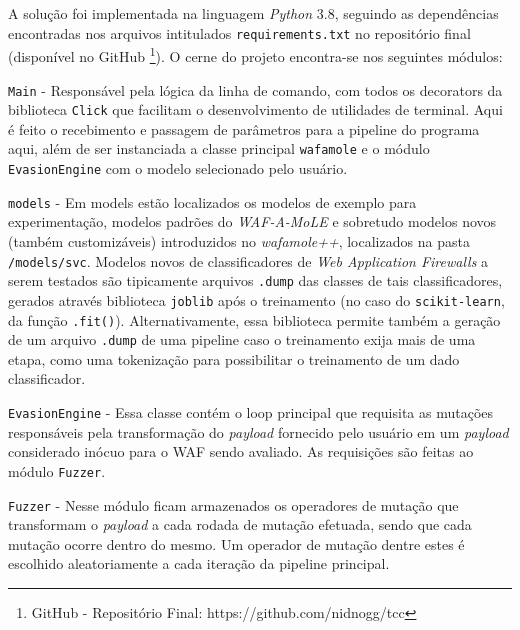 A solução foi implementada na linguagem \textit{Python} 3.8, seguindo as dependências encontradas nos arquivos intitulados \verb+requirements.txt+ no repositório final (disponível no GitHub \footnote{GitHub - Repositório Final: https://github.com/nidnogg/tcc}). O cerne do projeto encontra-se nos seguintes módulos:
\begin{alineas}
\item \verb+Main+ - Responsável pela lógica da linha de comando, com todos os decorators da biblioteca \verb+Click+ que facilitam o desenvolvimento de utilidades de terminal. Aqui é feito o recebimento e passagem de parâmetros para a pipeline do programa aqui, além de ser instanciada a classe principal \verb+wafamole+ e o módulo \verb+EvasionEngine+ com o modelo selecionado pelo usuário.
\item \verb+models+ - Em models estão localizados os modelos de exemplo para experimentação, modelos padrões do \textit{WAF-A-MoLE} e sobretudo modelos novos (também customizáveis) introduzidos no \textit{wafamole++}, localizados na pasta \verb+/models/svc+. Modelos novos de classificadores de \textit{Web Application Firewalls} a serem testados são tipicamente arquivos \verb+.dump+ das classes de tais classificadores, gerados através biblioteca \verb+joblib+ após o treinamento (no caso do \verb+scikit-learn+, da função \verb+.fit()+). Alternativamente, essa biblioteca permite também a geração de um arquivo \verb+.dump+ de uma pipeline caso o treinamento exija mais de uma etapa, como uma tokenização para possibilitar o treinamento de um dado classificador.
\item \verb+EvasionEngine+ - Essa classe contém o loop principal que requisita as mutações responsáveis pela transformação do \textit{payload} fornecido pelo usuário em um \textit{payload} considerado inócuo para o WAF sendo avaliado. As requisições são feitas ao módulo \verb+Fuzzer+.
\item \verb+Fuzzer+ - Nesse módulo ficam armazenados os operadores de mutação que transformam o \textit{payload} a cada rodada de mutação efetuada, sendo que cada mutação ocorre dentro do mesmo. Um operador de mutação dentre estes é escolhido aleatoriamente a cada iteração da pipeline principal.
\end{alineas}

